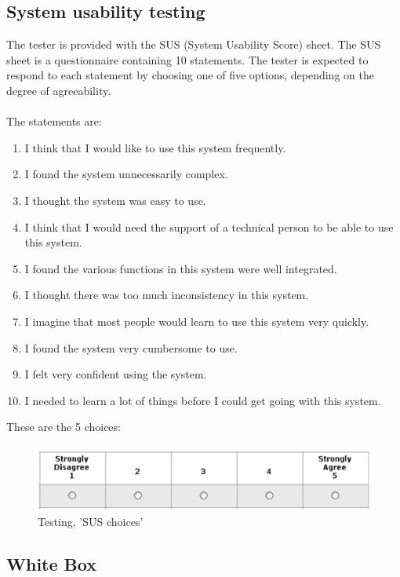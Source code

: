 \subsection{System usability testing}
The tester is provided with the SUS (System Usability Score) sheet. The SUS sheet is a questionnaire containing 10 statements. The tester is expected to respond to each statement by choosing one of five options, depending on the degree of agreeability.\\
\\
The statements are:
\begin{enumerate} \setlength{\itemsep}{0cm}\setlength{\parskip}{0cm}
	\item I think that I would like to use this system frequently.
	\item I found the system unnecessarily complex.
	\item I thought the system was easy to use.
	\item I think that I would need the support of a technical person to be able to use this system.
	\item I found the various functions in this system were well integrated.
	\item I thought there was too much inconsistency in this system.
	\item I imagine that most people would learn to use this system very quickly.
	\item I found the system very cumbersome to use.
	\item I felt very confident using the system.
	\item I needed to learn a lot of things before I could get going with this system.
\end{enumerate}
These are the 5 choices:

\begin{figure}[H]
  \centering
    \includegraphics[width=1.0\textwidth]{img/sus-responses.png}
  \caption{Testing, 'SUS choices'} 
  \label{fig:sus_response}
\end{figure}






\subsection{White Box}


